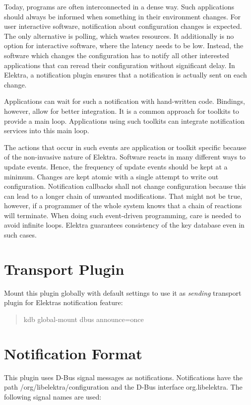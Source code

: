 Today, programs are often interconnected in a dense way. Such applications should always be informed when something in their environment changes. For user interactive software, notification about configuration changes is expected. The only alternative is polling, which wastes resources. It additionally is no option for interactive software, where the latency needs to be low. Instead, the software which changes the configuration has to notify all other interested applications that can reread their configuration without significant delay. In Elektra, a notification plugin ensures that a notification is actually sent on each change.

Applications can wait for such a notification with hand-\/written code. Bindings, however, allow for better integration. It is a common approach for toolkits to provide a main loop. Applications using such toolkits can integrate notification services into this main loop.

The actions that occur in such events are application or toolkit specific because of the non-\/invasive nature of Elektra. Software reacts in many different ways to update events. Hence, the frequency of update events should be kept at a minimum. Changes are kept atomic with a single attempt to write out configuration. Notification callbacks shall not change configuration because this can lead to a longer chain of unwanted modifications. That might not be true, however, if a programmer of the whole system knows that a chain of reactions will terminate. When doing such event-\/driven programming, care is needed to avoid infinite loops. Elektra guarantees consistency of the key database even in such cases.

\section*{Transport Plugin}

Mount this plugin globally with default settings to use it as {\itshape sending} transport plugin for Elektra\textquotesingle{}s notification feature\+:

\begin{quote}
kdb global-\/mount dbus announce=once \end{quote}


\section*{Notification Format}

This plugin uses D-\/\+Bus signal messages as notifications. Notifications have the path {\ttfamily /org/libelektra/configuration} and the D-\/\+Bus interface {\ttfamily org.\+libelektra}. The following signal names are used\+:


